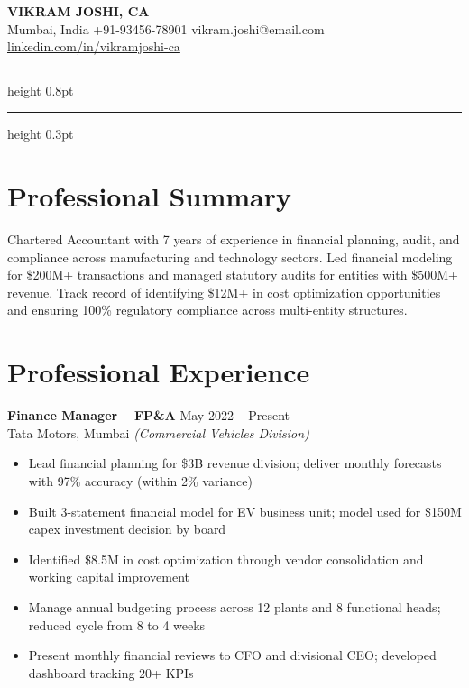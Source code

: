 \documentclass[10.5pt,a4paper]{article}
\begin{document}
\begin{center}
{\Large\bfseries VIKRAM JOSHI, CA}\\[6pt]
Mumbai, India \quad\textbar\quad +91-93456-78901 \quad\textbar\quad vikram.joshi@email.com \quad\textbar\quad \href{https://linkedin.com/in/vikramjoshi-ca}{linkedin.com/in/vikramjoshi-ca}
\end{center}

\vspace{4pt}
\hrule height 0.8pt
\vspace{2pt}
\hrule height 0.3pt

\section{Professional Summary}
Chartered Accountant with 7 years of experience in financial planning, audit, and compliance across manufacturing and technology sectors. Led financial modeling for \$200M+ transactions and managed statutory audits for entities with \$500M+ revenue. Track record of identifying \$12M+ in cost optimization opportunities and ensuring 100\% regulatory compliance across multi-entity structures.

\section{Professional Experience}

\textbf{Finance Manager -- FP\&A} \hfill May 2022 -- Present\\
Tata Motors, Mumbai \textit{(Commercial Vehicles Division)}
\begin{itemize}
    \item Lead financial planning for \$3B revenue division; deliver monthly forecasts with 97\% accuracy (within 2\% variance)
    \item Built 3-statement financial model for EV business unit; model used for \$150M capex investment decision by board
    \item Identified \$8.5M in cost optimization through vendor consolidation and working capital improvement
    \item Manage annual budgeting process across 12 plants and 8 functional heads; reduced cycle from 8 to 4 weeks
    \item Present monthly financial reviews to CFO and divisional CEO; developed dashboard tracking 20+ KPIs
\end{itemize}
\end{document}
